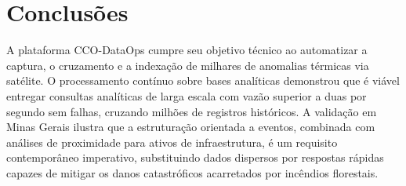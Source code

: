 \section*{Conclusões}

A plataforma CCO-DataOps cumpre seu objetivo técnico ao automatizar a captura, o cruzamento e a indexação de milhares de anomalias térmicas via satélite. O processamento contínuo sobre bases analíticas demonstrou que é viável entregar consultas analíticas de larga escala com vazão superior a duas por segundo sem falhas, cruzando milhões de registros históricos. A validação em Minas Gerais ilustra que a estruturação orientada a eventos, combinada com análises de proximidade para ativos de infraestrutura, é um requisito contemporâneo imperativo, substituindo dados dispersos por respostas rápidas capazes de mitigar os danos catastróficos acarretados por incêndios florestais.
